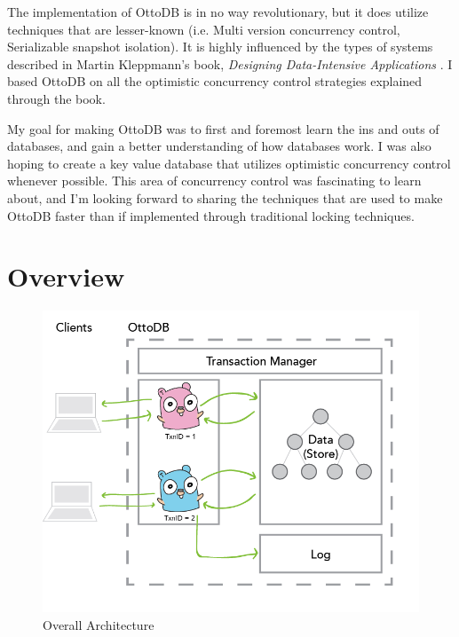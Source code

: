\documentclass[conference]{IEEEtran}
\begin{document}
    The implementation of OttoDB is in no way revolutionary, but it does utilize techniques that are lesser-known (i.e. Multi version concurrency control, Serializable snapshot isolation). It is highly influenced by the types of systems described in Martin Kleppmann's book, \textit{Designing Data-Intensive Applications} \cite{b1}. I based OttoDB on all the optimistic concurrency control strategies explained through the book.
    
    My goal for making OttoDB was to first and foremost learn the ins and outs of databases, and gain a better understanding of how databases work. I was also hoping to create a key value database that utilizes optimistic concurrency control whenever possible. This area of concurrency control was fascinating to learn about, and I'm looking forward to sharing the techniques that are used to make OttoDB faster than if implemented through traditional locking techniques.

    \section{Overview}

    \begin{figure}[h]
    \centering
    \includegraphics[width=\columnwidth]{figures/OverallArchitecture.png}
    \caption{Overall Architecture}
    \end{figure}
\end{document}
